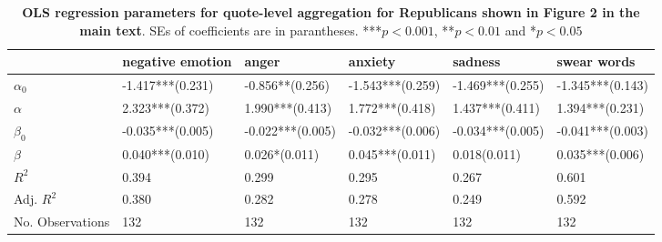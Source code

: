 \begin{table}[h]
\begin{adjustbox}{width=\linewidth, center}
\end{adjustbox}
	\end{table}

\begin{table}[h]\centering
\caption{\textbf{OLS regression parameters for quote-level aggregation for Republicans shown in Figure 2 in the main text}. SEs of coefficients are in parantheses. ***$p < 0.001$, **$p < 0.01$ and *$p < 0.05$}
	\label{fig: Party_7}
\begin{adjustbox}{width=\linewidth, center}
	\begin{tabular}{llllll}
	\toprule
	{} &            negative emotion &                                           anger &                     anxiety &                                                   sadness &                 swear words \\
	\midrule
	$\alpha_0$       &            -1.417***(0.231) &                      -0.856**\phantom{*}(0.256) &            -1.543***(0.259) &                                          -1.469***(0.255) &            -1.345***(0.143) \\
	$\alpha$         &  \phantom{-}2.323***(0.372) &                      \phantom{-}1.990***(0.413) &  \phantom{-}1.772***(0.418) &                                \phantom{-}1.437***(0.411) &  \phantom{-}1.394***(0.231) \\
	$\beta_0$        &            -0.035***(0.005) &                                -0.022***(0.005) &            -0.032***(0.006) &                                          -0.034***(0.005) &            -0.041***(0.003) \\
	$\beta$          &  \phantom{-}0.040***(0.010) &  \phantom{-}0.026*\phantom{*}\phantom{*}(0.011) &  \phantom{-}0.045***(0.011) &  \phantom{-}0.018\phantom{*}\phantom{*}\phantom{*}(0.011) &  \phantom{-}0.035***(0.006) \\
	$R^2$            &                       0.394 &                                           0.299 &                       0.295 &                                                     0.267 &                       0.601 \\
	Adj. $R^2$       &                       0.380 &                                           0.282 &                       0.278 &                                                     0.249 &                       0.592 \\
	No. Observations &                         132 &                                             132 &                         132 &                                                       132 &                         132 \\
	\bottomrule
	\end{tabular}
	
\end{adjustbox}
	\end{table}

